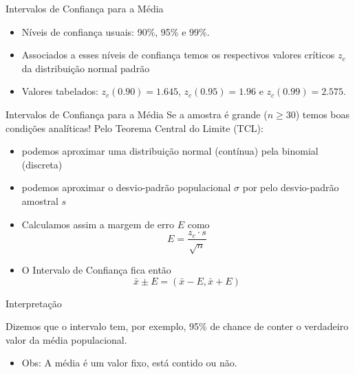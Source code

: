 \documentclass{beamer}
\begin{document}
\begin{frame}{Intervalos de Confiança para a Média}
  \begin{itemize}
  \item Níveis de confiança usuais: 90\%, 95\% e 99\%.
  \item Associados a esses níveis de confiança temos os respectivos
    valores críticos $z_c$ da distribuição normal padrão
  \item Valores tabelados: $z_c(0.90) = 1.645$, $z_c(0.95)=1.96$ e
    $z_c(0.99)=2.575$.
  \end{itemize}
\end{frame}


\begin{frame}{Intervalos de Confiança para a Média}
  Se a amostra é grande ($n \ge 30$) temos boas condições analíticas!
  Pelo Teorema Central do Limite (TCL):
  \begin{itemize}
  \item podemos aproximar uma distribuição normal (contínua) pela
    binomial (discreta)
  \item podemos aproximar o desvio-padrão populacional $\sigma$ por
    pelo desvio-padrão amostral $s$
  \item Calculamos assim a margem de erro $E$ como
    \begin{displaymath}
      E = \frac{z_c \cdot s}{\sqrt{n}}
    \end{displaymath}
  \item O Intervalo de Confiança fica então
    \begin{displaymath}
      \bar{x} \pm E = (\bar{x}-E , \bar{x} +E)      
    \end{displaymath}
  \end{itemize}
\end{frame}

\begin{frame}{Interpretação}
  \begin{block}{}
    Dizemos que o intervalo tem, por exemplo, 95\% de chance de
    conter o verdadeiro valor da média populacional.
  \end{block}
  \begin{itemize}
  \item Obs: A média é um valor fixo, está contido ou não.
  \end{itemize}
\end{frame}
\end{document}
